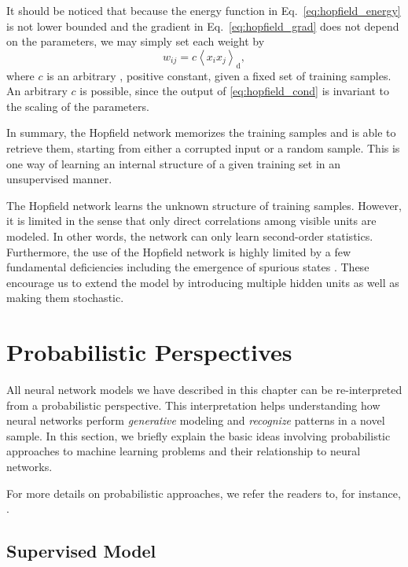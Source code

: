 \documentclass{now}
\newcommand{\td}[0]{\text{d}}
\begin{document}
It should be noticed that because the energy function in
Eq.~\eqref{eq:hopfield_energy} is not lower bounded and the
gradient in Eq.~\eqref{eq:hopfield_grad} does not depend on
the parameters, we may simply set each weight by
\[
w_{ij} = c \left< x_i x_j \right>_\td,
\]
where $c$ is an arbitrary
, positive constant, given a fixed set of training samples. An
arbitrary $c$ is possible, since the output of
\eqref{eq:hopfield_cond} is invariant to the scaling of the
parameters. 

In summary, the Hopfield network memorizes the training
samples and is able to retrieve them, starting from either a
corrupted input or a random sample. This is one way of
learning an internal structure of a given training set in an
unsupervised manner.

The Hopfield network learns the unknown structure of
training samples. However, it is limited in the sense that
only direct correlations among visible units are modeled. In
other words, the network can only learn second-order
statistics. Furthermore, the use of the Hopfield network is
highly limited by a few fundamental deficiencies including the emergence
of spurious states \citep[for more details,
see][]{Haykin2009}. These encourage us to extend the
model by introducing multiple hidden units as well as
making them stochastic.

\section{Probabilistic Perspectives}
\label{sec:prob_perspective}

All neural network models we have described in this chapter
can be re-interpreted from a probabilistic perspective. This
interpretation helps understanding how neural networks
perform \textit{generative} modeling and \textit{recognize}
patterns in a novel sample.  In this section, we briefly
explain the basic ideas involving probabilistic approaches
to machine learning problems and their relationship to neural
networks.

For more details on probabilistic approaches, we refer
the readers to, for instance, \citep{Murphy2012,Barber2012,Bishop2006}. 

\subsection{Supervised Model}
\end{document}
